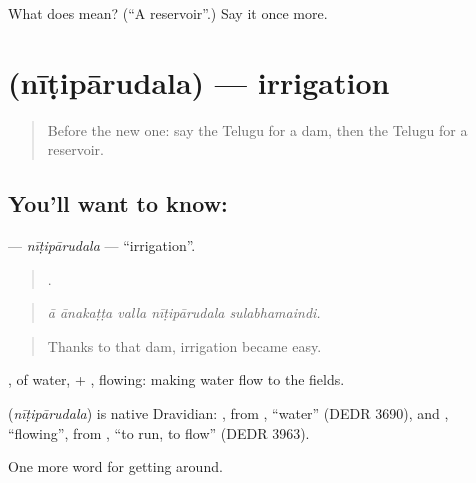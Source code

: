 \begin{tcolorbox}[breakable,colback=teal!4,colframe=teal!35!black,title={Before you move on}]
What does  mean? (\textquotedblleft{}A reservoir\textquotedblright{}.) Say it once more.
\end{tcolorbox}
\section[\texorpdfstring{\te{నీటిపారుదల} (nīṭipārudala)}{నీటిపారుదల (nīṭipārudala)}]{ (nīṭipārudala) — irrigation}

\label{lesson:TE-C475-nitiparudala}



\begin{quote}
Before the new one: say the Telugu for a dam, then the Telugu for a reservoir.
\end{quote}

\subsection*{You'll want to know: }
\textbf{} — \emph{nīṭipārudala} — \textquotedblleft{}irrigation\textquotedblright{}.

\begin{quote}
    .
\end{quote}

\begin{quote}
\emph{ā ānakaṭṭa valla nīṭipārudala sulabhamaindi.}
\end{quote}

\begin{quote}
Thanks to that dam, irrigation became easy.
\end{quote}

, of water, + , flowing: making water flow to the fields.

\begin{cousinweb}
\textbf{} (\emph{nīṭipārudala}) is native Dravidian: , from , \textquotedblleft{}water\textquotedblright{} (DEDR 3690), and , \textquotedblleft{}flowing\textquotedblright{}, from , \textquotedblleft{}to run, to flow\textquotedblright{} (DEDR 3963).
\end{cousinweb}

\begin{grammarlens}[title={What you've built}]
One more word for getting around.
\end{grammarlens}

